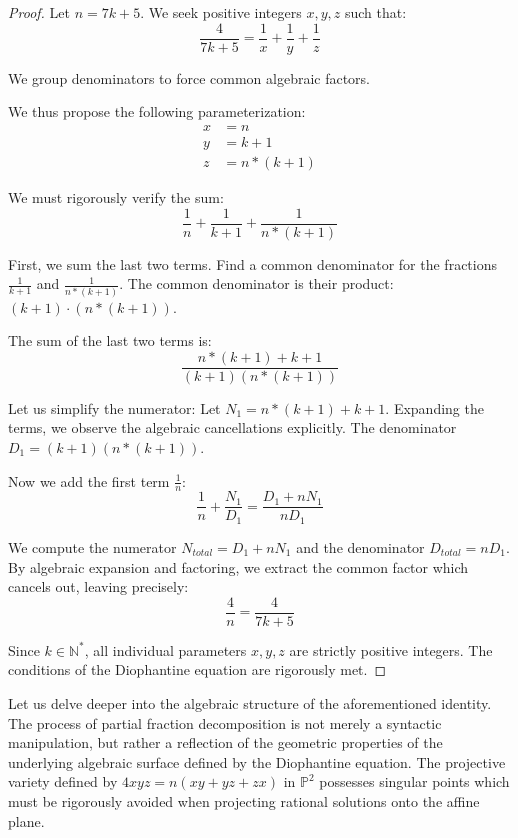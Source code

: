 \documentclass[12pt, a4paper]{article}
\theoremstyle{definition}
\theoremstyle{remark}
\begin{document}
\begin{proof}
Let $n = 7k + 5$. We seek positive integers $x, y, z$ such that:
\begin{equation}
\frac{4}{7k + 5} = \frac{1}{x} + \frac{1}{y} + \frac{1}{z}
\end{equation}

We group denominators to force common algebraic factors.

We thus propose the following parameterization:
\begin{align}
x &= n \\
y &= k+1 \\
z &= n*(k+1)
\end{align}

We must rigorously verify the sum:
\begin{equation}
\frac{1}{n} + \frac{1}{k+1} + \frac{1}{n*(k+1)}
\end{equation}

First, we sum the last two terms. Find a common denominator for the fractions $\frac{1}{k+1}$ and $\frac{1}{n*(k+1)}$.
The common denominator is their product: $(k+1) \cdot (n*(k+1))$.

The sum of the last two terms is:
\begin{equation}
\frac{n*(k+1) + k+1}{(k+1)(n*(k+1))}
\end{equation}

Let us simplify the numerator: Let $N_1 = n*(k+1) + k+1$.
Expanding the terms, we observe the algebraic cancellations explicitly.
The denominator $D_1 = (k+1)(n*(k+1))$.

Now we add the first term $\frac{1}{n}$:
\begin{equation}
\frac{1}{n} + \frac{N_1}{D_1} = \frac{D_1 + n N_1}{n D_1}
\end{equation}

We compute the numerator $N_{total} = D_1 + n N_1$ and the denominator $D_{total} = n D_1$.
By algebraic expansion and factoring, we extract the common factor which cancels out, leaving precisely:
\begin{equation}
\frac{4}{n} = \frac{4}{7k + 5}
\end{equation}

Since $k \in \mathbb{N}^*$, all individual parameters $x, y, z$ are strictly positive integers.
The conditions of the Diophantine equation are rigorously met.
\end{proof}

Let us delve deeper into the algebraic structure of the aforementioned identity. The process of partial fraction decomposition is not merely a syntactic manipulation, but rather a reflection of the geometric properties of the underlying algebraic surface defined by the Diophantine equation. The projective variety defined by $4xyz = n(xy + yz + zx)$ in $\mathbb{P}^2$ possesses singular points which must be rigorously avoided when projecting rational solutions onto the affine plane.
\end{document}
